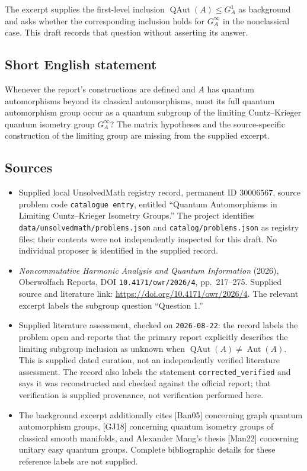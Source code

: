 \documentclass[11pt]{article}
\begin{document}
The excerpt supplies the first-level inclusion \(\operatorname{QAut}(A)\leq G_A^1\) as background and asks whether the corresponding inclusion holds for \(G_A^\infty\) in the nonclassical case. This draft records that question without asserting its answer.
\subsection{Short English statement}
Whenever the report's constructions are defined and \(A\) has quantum automorphisms beyond its classical automorphisms, must its full quantum automorphism group occur as a quantum subgroup of the limiting Cuntz--Krieger quantum isometry group \(G_A^\infty\)? The matrix hypotheses and the source-specific construction of the limiting group are missing from the supplied excerpt.
\subsection{Sources}
\begin{itemize}
\item Supplied local UnsolvedMath registry record, permanent ID \(30006567\), source problem code \texttt{catalogue entry}, entitled ``Quantum Automorphisms in Limiting Cuntz--Krieger Isometry Groups.'' The project identifies \texttt{data/unsolvedmath/problems.json} and \texttt{catalog/problems.json} as registry files; their contents were not independently inspected for this draft. No individual proposer is identified in the supplied record.
\item \emph{Noncommutative Harmonic Analysis and Quantum Information} (2026), Oberwolfach Reports, DOI \texttt{10.4171/owr/2026/4}, pp.~217--275. Supplied source and literature link: \url{https://doi.org/10.4171/owr/2026/4}. The relevant excerpt labels the subgroup question ``Question 1.''
\item Supplied literature assessment, checked on \texttt{2026-08-22}: the record labels the problem open and reports that the primary report explicitly describes the limiting subgroup inclusion as unknown when \(\operatorname{QAut}(A)\ne\operatorname{Aut}(A)\). This is supplied dated curation, not an independently verified literature assessment. The record also labels the statement \texttt{corrected\_verified} and says it was reconstructed and checked against the official report; that verification is supplied provenance, not verification performed here.
\item The background excerpt additionally cites [Ban05] concerning graph quantum automorphism groups, [GJ18] concerning quantum isometry groups of classical smooth manifolds, and Alexander Mang's thesis [Man22] concerning unitary easy quantum groups. Complete bibliographic details for these reference labels are not supplied.
\end{itemize}
\end{document}
